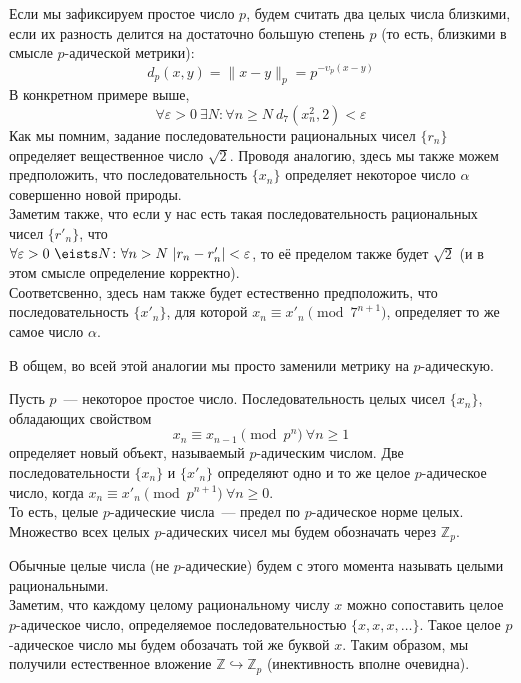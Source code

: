 \documentclass[11pt]{article}
\begin{document}
    Если мы зафиксируем простое число $p$, будем считать два целых числа близкими, если их разность делится на достаточно большую
    степень $p$ (то есть, близкими в смысле $p$-адической метрики):
    \[ d_p(x, y) = \| x - y \|_p = p^{-\upsilon_p(x - y)}\]
    В конкретном примере выше,
    \[ \forall \varepsilon > 0 \ \exists N\colon \forall n \ge N \  d_7(x_n^2, 2) < \varepsilon \]
    Как мы помним, задание последовательности рациональных чисел $\{ r_n \}$ определяет вещественное число $\sqrt{2}$.
    Проводя аналогию, здесь мы также можем предположить, что последовательность $\{ x_n \}$ определяет некоторое
    число $\alpha$ совершенно новой природы. \\
    Заметим также, что если у нас есть такая последовательность рациональных чисел $\{ r'_n \}$, что \\$\forall \varepsilon > 0 \ \eists N\colon \forall n > N \ |r_n - r'_n| < \varepsilon $, то
    её пределом также будет $\sqrt{2}$ (и в этом смысле определение корректно).\\
    Соответсвенно, здесь нам также будет естественно предположить, что последовательность $\{ x'_n \}$, для которой $x_n \equiv x'_n \pmod{7^{n + 1}}$, определяет то же самое число $\alpha$.
    \begin{remark}
        В общем, во всей этой аналогии мы просто заменили метрику на $p$-адическую.
    \end{remark}
    \begin{definition}
        Пусть $p$~--- некоторое простое число. Последовательность целых чисел $\{ x_n \}$, обладающих свойством
        \[ x_n \equiv x_{n - 1} \pmod{p^n} \ \forall n \ge 1\]
        определяет новый объект, называемый $p$-адическим числом. Две последовательности $\{ x_n \}$ и $\{ x'_n \}$ определяют одно и то же
        целое $p$-адическое число, когда $x_n \equiv x'_n \pmod{p^{n + 1}} \ \forall n \ge 0$.\\
        То есть, целые $p$-адические числа~--- предел по $p$-адическое норме целых.\\
        Множество всех целых $p$-адических чисел мы будем обозначать через $\mathbb{Z}_p$.\\
    \end{definition}
    Обычные целые числа (не $p$-адические) будем с этого момента называть целыми рациональными.\\


    Заметим, что каждому целому рациональному числу $x$ можно сопоставить целое $p$-адическое число, определяемое последовательностью
    $\{ x, x, x, \ldots \}$. Такое целое $p$-адическое число мы будем обозачать той же буквой $x$. Таким образом, мы получили естественное
    вложение $\mathbb{Z} \hookrightarrow \mathbb{Z}_p$ (инективность вполне очевидна).
\end{document}
